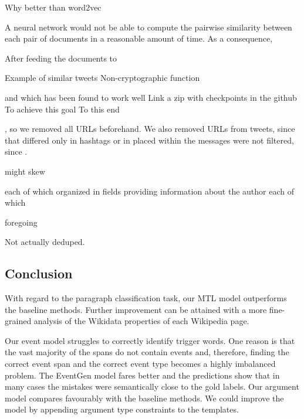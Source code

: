 \documentclass[runningheads]{llncs}
\begin{document}
Why better than word2vec

A neural network would not be able to compute the pairwise similarity between each pair of documents in a reasonable amount of time. As a consequence, 

After feeding the documents to 

Example of similar tweets
Non-cryptographic function

and which has been found to work well  
Link a zip with checkpoints in the github
To achieve this goal
To this end

, so we removed all URLs 
beforehand. 
We also removed URLs from tweets, since that differed only in hashtags or in  placed within the messages were not filtered, since . 

might skew

each of which organized in fields providing information about the author
each of which  

foregoing

Not actually deduped.

\subsection{Conclusion}

With regard to the paragraph classification task, our MTL model outperforms the baseline methods. Further improvement can be attained with a more fine-grained analysis of the Wikidata properties of each Wikipedia page.

Our event model struggles to correctly identify trigger words. One reason is that the vast majority of the spans do not contain events and, therefore, finding the correct event span and the correct event type becomes a highly imbalanced problem. The EventGen model fares better and the predictions show that in many cases the mistakes were semantically close to the gold labels. Our argument model compares favourably with the baseline methods. We could improve the model by appending argument type constraints to the templates.



\end{document}
